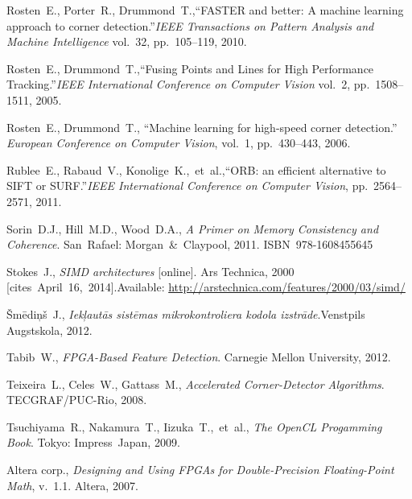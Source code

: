 {\begin{thebibliography}{99}
			Rosten~E., Porter~R., Drummond~T.,\linebreak[1]
			``FASTER and better: A machine learning approach to corner detection.''\linebreak[1]
			\textit{IEEE Transactions on Pattern Analysis and Machine Intelligence} vol.~32,
			pp.~105--119, 2010.
		
			Rosten~E., Drummond~T.,\linebreak[1]
			``Fusing Points and Lines for High Performance Tracking.''\linebreak[1]
			\textit{IEEE International Conference on Computer Vision} vol.~2,
			pp.~1508--1511, 2005.
		
			Rosten~E., Drummond~T.,
			``Machine learning for high-speed corner detection.''
			\textit{European Conference on Computer Vision}, vol.~1, pp.~430--443,
			2006.
		
			Rublee~E., Rabaud~V., Konolige~K.,~et~al.,\linebreak[1]
			``ORB: an efficient alternative to SIFT or SURF.''\linebreak[1]
			\textit{IEEE International Conference on Computer Vision},
			pp.~2564--2571, 2011.
		
			Sorin~D.J., Hill~M.D., Wood~D.A.,
			\textit{A Primer on Memory Consistency and Coherence}.
			San~Rafael: Morgan~\&~Claypool, 2011. ISBN~978-1608455645
		
			Stokes~J.,
			\textit{SIMD architectures} [online]. Ars Technica, 2000 %
			[cites~April~16,~2014].\linebreak[1]
			Available: \url{http://arstechnica.com/features/2000/03/simd/}
		
			Šmēdiņš~J.,
			\textit{Iekļautās sistēmas mikrokontroliera kodola izstrāde}.\linebreak[1]
			Venstpils Augstskola, 2012.
		
			Tabib~W.,
			\textit{FPGA-Based Feature Detection}.
			Carnegie Mellon University, 2012.
		
			Teixeira~L., Celes~W., Gattass~M.,
			\textit{Accelerated Corner-Detector Algorithms}.
			TECGRAF/PUC-Rio, 2008.
		
			Tsuchiyama~R., Nakamura~T., Iizuka~T.,~et~al.,
			\textit{The OpenCL Progamming Book}. Tokyo: Impress~Japan, 2009.
		
			Altera corp., \textit{Designing and Using FPGAs for
				Double-Precision Floating-Point Math}, v.~1.1. Altera, 2007.
		

\end{thebibliography}}
